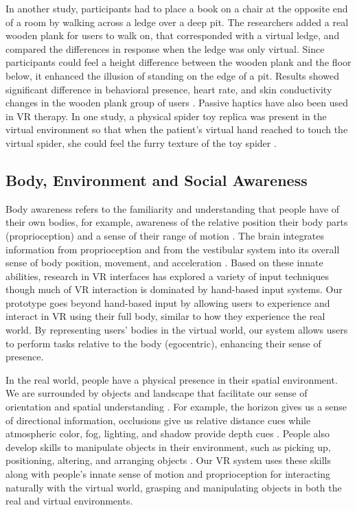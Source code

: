 \documentclass{sigchi}
\begin{document}
In another study, participants had to place a book on a chair at the opposite end of a room by walking across a ledge over a deep pit. The researchers added a real wooden plank for users to walk on, that corresponded with a virtual ledge, and compared the differences in response when the ledge was only virtual. Since participants could feel a height difference between the wooden plank and the floor below, it enhanced the illusion of standing on the edge of a pit. Results showed significant difference in behavioral presence, heart rate, and skin conductivity changes in the wooden plank group of users \cite{insko2001passive}. Passive haptics have also been used in VR therapy. In one study, a physical spider toy replica was present in the virtual environment so that when the patient's virtual hand reached to touch the virtual spider, she could feel the furry texture of the toy spider \cite{carlin1997virtual}.


\subsection{Body, Environment and Social Awareness} 
Body awareness refers to the familiarity and understanding that people have of their own bodies, for example, awareness of the relative position their body parts (proprioception) and a sense of their range of motion \cite{jacob2008reality}.  The brain integrates information from proprioception and from the vestibular system into its overall sense of body position, movement, and acceleration \cite{wiki:proprioception}. Based on these innate abilities, research in VR interfaces has explored a variety of input techniques though much of VR interaction is dominated by hand-based input systems. Our prototype goes beyond hand-based input by allowing users to experience and interact in VR using their full body, similar to how they experience the real world. By representing users' bodies in the virtual world, our system allows users to perform tasks relative to the body (egocentric), enhancing their sense of presence.

In the real world, people have a physical presence in their spatial environment. We are surrounded by objects and landscape that facilitate our sense of orientation and spatial understanding \cite{jacob2008reality}. For example, the horizon gives us a sense of directional information, occlusions give us relative distance cues while atmospheric color, fog, lighting, and shadow provide depth cues \cite{bowman20043d}.  People also develop skills to manipulate objects in their environment, such as picking up, positioning, altering, and arranging objects \cite{jacob2008reality}. Our VR system uses these skills along with people's innate sense of motion and proprioception for interacting naturally with the virtual world, grasping and manipulating objects in both the real and virtual environments. 
\end{document}
